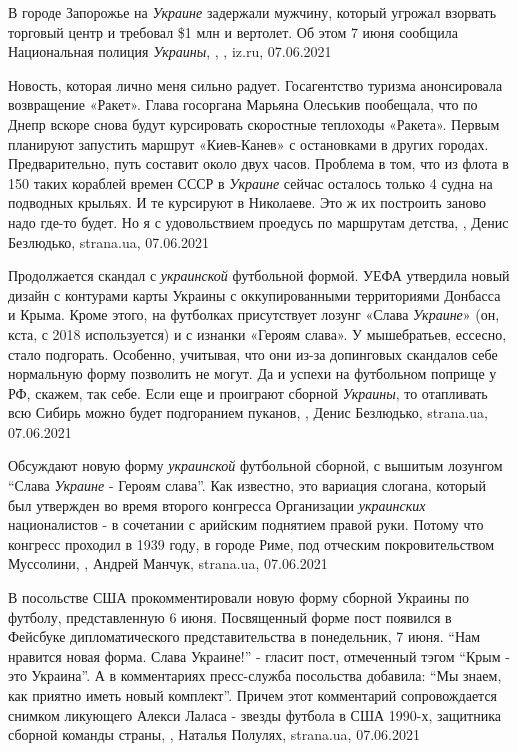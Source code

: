 В городе Запорожье на \emph{Украине} задержали мужчину, который угрожал взорвать
торговый центр и требовал \$1 млн и вертолет. Об этом 7 июня сообщила
Национальная полиция \emph{Украины},
, , iz.ru, 07.06.2021

Новость, которая лично меня сильно радует. Госагентство туризма анонсировала
возвращение «Ракет». Глава госоргана Марьяна Олеськив пообещала, что по Днепр
вскоре снова будут курсировать скоростные теплоходы «Ракета». Первым планируют
запустить маршрут «Киев-Канев» с остановками в других городах. Предварительно,
путь составит около двух часов. Проблема в том, что из флота в 150 таких
кораблей времен СССР в \emph{Украине} сейчас осталось только 4 судна на подводных
крыльях. И те курсируют в Николаеве. Это ж их построить заново надо где-то
будет. Но я с удовольствием проедусь по маршрутам детства,
, Денис Безлюдько, strana.ua, 07.06.2021

Продолжается скандал с \emph{украинской} футбольной формой. УЕФА утвердила новый
дизайн с контурами карты Украины с оккупированными территориями Донбасса и
Крыма. Кроме этого, на футболках присутствует лозунг «Слава \emph{Украине}» (он, кста,
с 2018 используется) и с изнанки «Героям слава». У мышебратьев, ессесно, стало
подгорать. Особенно, учитывая, что они из-за допинговых скандалов себе
нормальную форму позволить не могут. Да и успехи на футбольном поприще у РФ,
скажем, так себе. Если еще и проиграют сборной \emph{Украины}, то отапливать всю
Сибирь можно будет подгоранием пуканов,
, Денис Безлюдько, strana.ua, 07.06.2021

Обсуждают новую форму \emph{украинской} футбольной сборной, с вышитым лозунгом
\enquote{Слава \emph{Украине} - Героям слава}. Как известно, это вариация
слогана, который был утвержден во время второго конгресса Организации
\emph{украинских} националистов - в сочетании с арийским поднятием правой руки.
Потому что конгресс проходил в 1939 году, в городе Риме, под отческим
покровительством Муссолини,
, Андрей Манчук, strana.ua, 07.06.2021

В посольстве США прокомментировали новую форму сборной Украины по футболу,
представленную 6 июня.  Посвященный форме пост появился в Фейсбуке
дипломатического представительства в понедельник, 7 июня.  \enquote{Нам нравится новая
форма. Слава Украине!} - гласит пост, отмеченный тэгом \enquote{Крым - это Украина}.  А
в комментариях пресс-служба посольства добавила: \enquote{Мы знаем, как приятно иметь
новый комплект}. Причем этот комментарий сопровождается снимком ликующего
Алекси Лаласа - звезды футбола в США 1990-х, защитника сборной команды страны,
, Наталья Полулях, strana.ua, 07.06.2021

